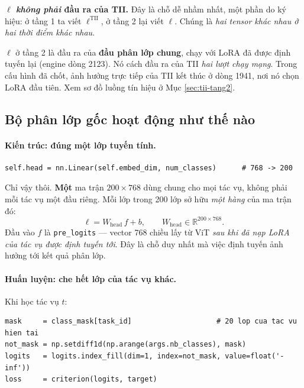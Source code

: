 \documentclass[11pt,a4paper]{article}
\newenvironment{luuy}{\begin{leftbar}\noindent\ignorespaces}{\end{leftbar}}
\begin{document}
\begin{luuy}
\textbf{$\ell$ \emph{không phải} đầu ra của TII.} Đây là chỗ dễ nhầm nhất, một
phần do ký hiệu: ở tầng 1 ta viết $\ell^{\mathrm{TII}}$, ở tầng 2 lại viết
$\ell$. Chúng là \emph{hai tensor khác nhau ở hai thời điểm khác nhau}.

$\ell$ ở tầng 2 là đầu ra của \textbf{đầu phân lớp chung}, chạy với LoRA đã được
định tuyến lại (engine dòng 2123). Nó cách đầu ra của TII \emph{hai lượt chạy
mạng}. Trong cấu hình đã chốt, ảnh hưởng trực tiếp của TII kết thúc ở dòng 1941,
nơi nó chọn LoRA đầu tiên. Xem sơ đồ luồng tín hiệu ở Mục \ref{sec:tii-tang2}.
\end{luuy}

\subsection{Bộ phân lớp gốc hoạt động như thế nào}
\label{sec:dau-chinh}

\paragraph{Kiến trúc: đúng một lớp tuyến tính.}
\begin{footnotesize}
\begin{verbatim}
self.head = nn.Linear(self.embed_dim, num_classes)      # 768 -> 200
\end{verbatim}
\end{footnotesize}

Chỉ vậy thôi. \textbf{Một} ma trận $200 \times 768$ dùng chung cho mọi tác vụ,
không phải mỗi tác vụ một đầu riêng. Mỗi lớp trong 200 lớp sở hữu \emph{một
hàng} của ma trận đó:
\[ \ell = W_{\mathrm{head}}\, f + b, \qquad W_{\mathrm{head}} \in \mathbb{R}^{200 \times 768} . \]
Đầu vào $f$ là \texttt{pre\_logits} --- vector 768 chiều lấy từ ViT \emph{sau khi
đã nạp LoRA của tác vụ được định tuyến tới}. Đây là chỗ duy nhất mà việc định
tuyến ảnh hưởng tới kết quả phân lớp.

\paragraph{Huấn luyện: che hết lớp của tác vụ khác.}
Khi học tác vụ $t$:
\begin{footnotesize}
\begin{verbatim}
mask     = class_mask[task_id]                    # 20 lop cua tac vu hien tai
not_mask = np.setdiff1d(np.arange(args.nb_classes), mask)
logits   = logits.index_fill(dim=1, index=not_mask, value=float('-inf'))
loss     = criterion(logits, target)
\end{verbatim}
\end{footnotesize}
\end{document}
